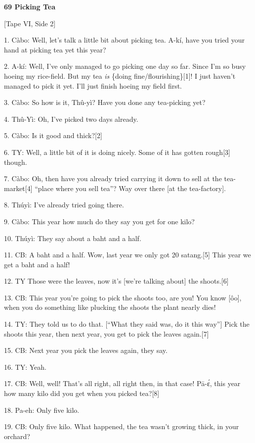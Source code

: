 
\textbf{69 Picking Tea}

[Tape VI, Side 2]

1. Càbo: Well, let's talk a little bit about picking tea.  A-kí, have you tried
your hand at picking tea yet this year?

2. A-kí: Well, I've only managed to go picking one day so far.  Since I'm so busy
hoeing my rice-field.  But my tea \textit{is} \{doing fine/flourishing\}[1]!  I
just haven't managed to pick it yet.  I'll just finish hoeing my field first.

3. Càbo: So how is it, Thû-yì? Have you done any tea-picking yet?

4. Thû-Yì: Oh, I've picked two days already.

5. Càbo: Is it good and thick?[2]

6. TY: Well, a little bit of it is doing nicely.  Some of it has gotten rough[3]
though.

7. Càbo: Oh, then have you already tried carrying it down to sell at the tea-market[4]
``place where you sell tea''?  Way over there [at the tea-factory].

8. Thúyì: I've already tried going there.

9. Càbo: This year how much do they say you get for one kilo?

10. Thúyì: They say about a baht and a half.

11. CB: A baht and a half.  Wow, last year we only got 20 satang.[5]  This year
we get a baht and a half!

12. TY Those were the leaves, now it's [we're talking about] the shoots.[6]

13. CB: This year you're going to pick the shoots too, are you!  You know [ôo],
when you do something like plucking the shoots the plant nearly dies!

14. TY: They told us to do that.  [``What they said was, do it this way'']  Pick
the shoots this year, then next year, you get to pick the leaves again.[7]

15. CB: Next year you pick the leaves again, they say.

16. TY: Yeah.

17. CB: Well, well!  That's all right, all right then, in that case!  Pā-ɛ́,
this year how many kilo did you get when you picked tea?[8]

18. Pa-eh: Only five kilo.

19. CB: Only five kilo.  What happened, the tea wasn't growing thick, in your orchard?

